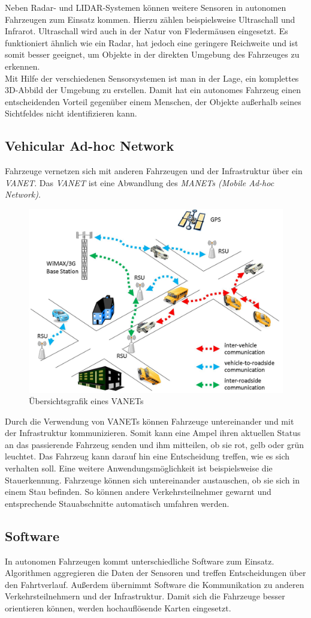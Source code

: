 Neben Radar- und LIDAR-Systemen können weitere Sensoren in autonomen Fahrzeugen zum Einsatz kommen. Hierzu zählen beispielsweise Ultraschall und Infrarot.
Ultraschall wird auch in der Natur von Fledermäusen eingesetzt. Es funktioniert ähnlich wie ein Radar, hat jedoch eine geringere Reichweite und ist somit besser geeignet, um Objekte in der direkten Umgebung des Fahrzeuges zu erkennen.\\

Mit Hilfe der verschiedenen Sensorsystemen ist man in der Lage, ein komplettes 3D-Abbild der Umgebung zu erstellen. Damit hat ein autonomes Fahrzeug einen entscheidenden Vorteil gegenüber einem Menschen, der Objekte außerhalb seines Sichtfeldes nicht identifizieren kann.\\

\subsection{Vehicular Ad-hoc Network}

Fahrzeuge vernetzen sich mit anderen Fahrzeugen und der Infrastruktur über ein \textit{VANET}. Das \textit{VANET} ist eine Abwandlung des \textit{MANETs (Mobile Ad-hoc Network)}. 

\begin{figure}[H]
    \centering
    \includegraphics[width=.485\textwidth]{resources/images/vanet.jpg}
    \caption{Übersichtsgrafik eines VANETs \cite{vanet}}
\end{figure}

Durch die Verwendung von VANETs können Fahrzeuge untereinander und mit der Infrastruktur kommunizieren. Somit kann eine Ampel ihren aktuellen Status an das passierende Fahrzeug senden und ihm mitteilen, ob sie rot, gelb oder grün leuchtet. Das Fahrzeug kann darauf hin eine Entscheidung treffen, wie es sich verhalten soll. Eine weitere Anwendungsmöglichkeit ist beispielsweise die Stauerkennung. Fahrzeuge können sich untereinander austauschen, ob sie sich in einem Stau befinden. So können andere Verkehrsteilnehmer gewarnt und entsprechende Stauabschnitte automatisch umfahren werden.

\subsection{Software}

In autonomen Fahrzeugen kommt unterschiedliche Software zum Einsatz. Algorithmen aggregieren die Daten der Sensoren und treffen Entscheidungen über den Fahrtverlauf. Außerdem übernimmt Software die Kommunikation zu anderen Verkehrsteilnehmern und der Infrastruktur. Damit sich die Fahrzeuge besser orientieren können, werden hochauflösende Karten eingesetzt.